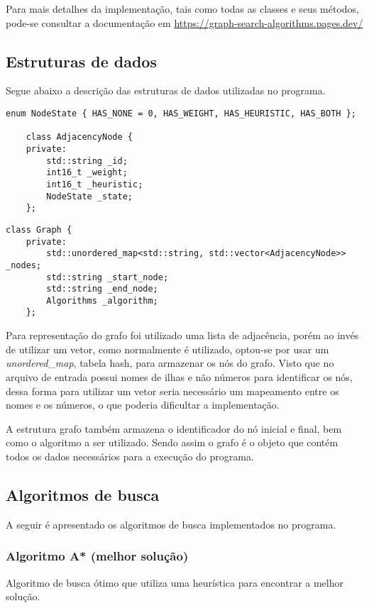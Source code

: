 \documentclass[12pt, a4paper]{article}
\begin{document}
Para mais detalhes da implementação, tais como todas as classes e seus métodos,
pode-se consultar a documentação em \url{https://graph-search-algorithms.pages.dev/}

\subsection{Estruturas de dados}\label{sec:estruturas}
Segue abaixo a descrição das estruturas de dados utilizadas no programa.

\begin{lstlisting}[caption={Estrutura de dados para representar um nó do grafo.}, label={lst:node}]
    enum NodeState { HAS_NONE = 0, HAS_WEIGHT, HAS_HEURISTIC, HAS_BOTH };

    class AdjacencyNode {
    private:
        std::string _id;
        int16_t _weight;
        int16_t _heuristic;
        NodeState _state;
    };
\end{lstlisting}

\begin{lstlisting}[caption={Estrutura de dados para representar o grafo.}, label={lst:graph}]
    class Graph {
    private:
        std::unordered_map<std::string, std::vector<AdjacencyNode>> _nodes;
        std::string _start_node;
        std::string _end_node;
        Algorithms _algorithm;
    };
\end{lstlisting}

Para representação do grafo foi utilizado uma lista de adjacência,
porém ao invés de utilizar um vetor, como normalmente é utilizado,
optou-se por usar um \textit{unordered\_map}, tabela hash, para armazenar os nós do grafo.
Visto que no arquivo de entrada possui nomes de ilhas e não números para identificar os nós,
dessa forma para utilizar um vetor seria necessário um mapeamento entre os nomes e os números,
o que poderia dificultar a implementação.

A estrutura grafo também armazena o identificador do nó inicial e final,
bem como o algoritmo a ser utilizado.
Sendo assim o grafo é o objeto que contém todos os dados necessários para a execução do programa.

\subsection{Algoritmos de busca}\label{sec:algoritmos}
A seguir é apresentado os algoritmos de busca implementados no programa.

\subsubsection{Algoritmo A* (melhor solução)}\label{sec:astar}
Algoritmo de busca ótimo que utiliza uma heurística para encontrar a melhor solução.
\end{document}
